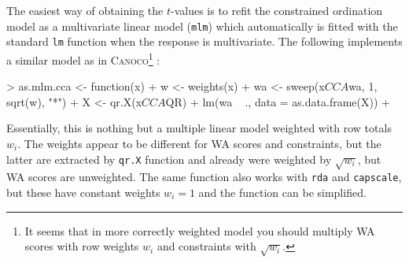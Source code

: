\documentclass[a4paper]{article}
\begin{document}
The easiest way of obtaining the $t$-values is to refit the
constrained ordination model as a multivariate linear model
(\texttt{mlm}) which automatically is fitted with the standard
\texttt{lm} function when the response is multivariate.  The following
implements a similar model as in \textsc{Canoco}\footnote{It seems
  that in more correctly weighted model you should multiply WA scores with
row weights $w_i$ and constraints with $\sqrt{w_i}$.} \cite{CANOCO4}:
\begin{Schunk}
\begin{Sinput}
> as.mlm.cca <- function(x) {
+     w <- weights(x)
+     wa <- sweep(x$CCA$wa, 1, sqrt(w), "*")
+     X <- qr.X(x$CCA$QR)
+     lm(wa ~ ., data = as.data.frame(X))
+ }
\end{Sinput}
\end{Schunk}
Essentially, this is nothing but a multiple linear model weighted with
row totals $w_i$.  The weights appear to be different for WA scores
and constraints, but the latter are extracted by \texttt{qr.X}
function and already were weighted by $\sqrt{w_i}$, but WA scores are
unweighted.  The same function also works with \texttt{rda} and
\texttt{capscale}, but these have constant weights $w_i = 1$ and the
function can be simplified.
\end{document}
